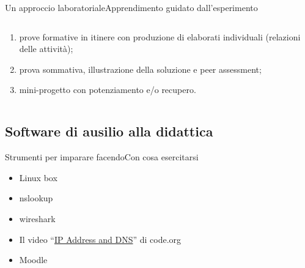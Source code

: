 \documentclass[italian]{beamer}
\begin{document}
\begin{frame}[fragile]{Un approccio laboratoriale}{Apprendimento guidato dall'esperimento}
\begin{columns}
\begin{column}{0.7\textwidth}
\begin{enumerate}
				\item prove formative in itinere con produzione di elaborati individuali (relazioni delle attivit\`a);
				
				\item prova sommativa, illustrazione della soluzione e peer assessment;
				
				\item mini-progetto con potenziamento e/o recupero.
			\end{enumerate}			
			
		\end{column}
	\end{columns}

	\note{%
		
	}%
\end{frame}

\subsection[Strumenti\ldots]{Software di ausilio alla didattica}
\begin{frame}{Strumenti per imparare facendo}{Con cosa esercitarsi}
	\begin{itemize}
		\item Linux box
		
		\item nslookup
		
		\item wireshark
		
		\item Il video ``\hyperlink{https://youtu.be/D-VCk4_GMjQ?list=PLa_solX20V8I8t5sIW7A5Vx3v5YZ-OM3S}{IP Address and DNS}'' di code.org
		
		\item Moodle
		
	\end{itemize}
	\note{%
		
	}%
\end{frame}
\end{document}
